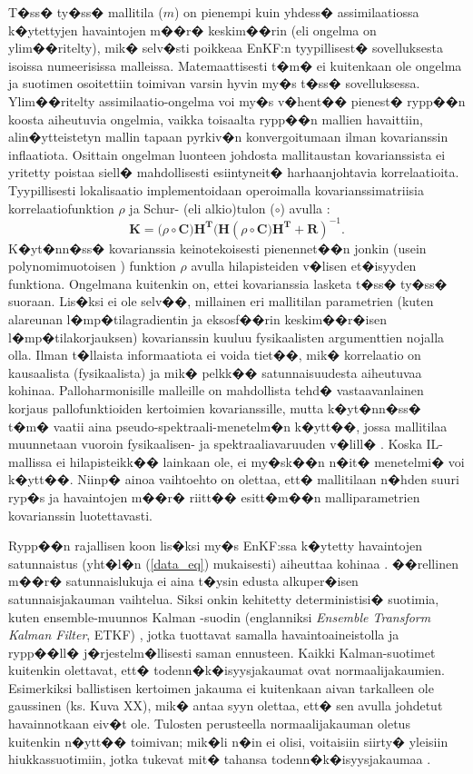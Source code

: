 \documentclass[12pt,a4paper,finnish,margin=2in]{article}
\begin{document}
T�ss� ty�ss� mallitila ($m$) on pienempi kuin yhdess� assimilaatiossa k�ytettyjen havaintojen m��r� keskim��rin (eli ongelma on ylim��ritelty), mik� selv�sti poikkeaa EnKF:n tyypillisest� sovelluksesta isoissa numeerisissa malleissa. Matemaattisesti t�m� ei kuitenkaan ole ongelma ja suotimen osoitettiin toimivan varsin hyvin my�s t�ss� sovelluksessa. Ylim��ritelty assimilaatio-ongelma voi my�s v�hent�� pienest� rypp��n koosta aiheutuvia ongelmia, vaikka toisaalta rypp��n mallien havaittiin, alin�ytteistetyn mallin tapaan pyrkiv�n konvergoitumaan ilman kovarianssin inflaatiota. Osittain ongelman luonteen johdosta mallitaustan kovarianssista ei yritetty poistaa siell� mahdollisesti esiintyneit� harhaanjohtavia korrelaatioita. Tyypillisesti lokalisaatio implementoidaan operoimalla kovarianssimatriisia korrelaatiofunktion $\rho$ ja Schur- (eli alkio)tulon ($\circ$) avulla \citep{houtekamer_2001}:
\begin{equation} \label{lm_eq}
\mathbf{K} = (\rho \circ \mathbf{C)H^T}(\mathbf{H}(\rho \circ \mathbf{C)H^T + R})^{-1}.
\end{equation}
K�yt�nn�ss� kovarianssia keinotekoisesti pienennet��n jonkin (usein polynomimuotoisen \citep{gaspari_1999}) funktion $\rho$ avulla hilapisteiden v�lisen et�isyyden funktiona. Ongelmana kuitenkin on, ettei kovarianssia lasketa t�ss� ty�ss� suoraan. Lis�ksi ei ole selv��, millainen eri mallitilan parametrien (kuten alareunan l�mp�tilagradientin ja eksosf��rin keskim��r�isen l�mp�tilakorjauksen) kovarianssin kuuluu fysikaalisten argumenttien nojalla olla. Ilman t�llaista informaatiota ei voida tiet��, mik� korrelaatio on kausaalista (fysikaalista) ja mik� pelkk�� satunnaisuudesta aiheutuvaa kohinaa. Palloharmonisille malleille on mahdollista tehd� vastaavanlainen korjaus pallofunktioiden kertoimien kovarianssille, mutta k�yt�nn�ss� t�m� vaatii aina pseudo-spektraali-menetelm�n k�ytt��, jossa mallitilaa muunnetaan vuoroin fysikaalisen- ja spektraaliavaruuden v�lill� \citep{buehner_2012}. Koska IL-mallissa ei hilapisteikk�� lainkaan ole, ei my�sk��n n�it� menetelmi� voi k�ytt��. Niinp� ainoa vaihtoehto on olettaa, ett� mallitilaan n�hden suuri ryp�s ja havaintojen m��r� riitt�� esitt�m��n malliparametrien kovarianssin luotettavasti. 

Rypp��n rajallisen koon lis�ksi my�s EnKF:ssa k�ytetty havaintojen satunnaistus (yht�l�n (\ref{data_eq}) mukaisesti) aiheuttaa kohinaa \citep{whitaker_2002}. ��rellinen m��r� satunnaislukuja ei aina t�ysin edusta alkuper�isen satunnaisjakauman vaihtelua. Siksi onkin kehitetty deterministisi� suotimia, kuten ensemble-muunnos Kalman -suodin (englanniksi \textit{Ensemble Transform Kalman Filter}, ETKF) \citep{bishop_2001}, jotka tuottavat samalla havaintoaineistolla ja rypp��ll� j�rjestelm�llisesti saman ennusteen. Kaikki Kalman-suotimet kuitenkin olettavat, ett� todenn�k�isyysjakaumat ovat normaalijakaumien. Esimerkiksi ballistisen kertoimen jakauma ei kuitenkaan aivan tarkalleen ole gaussinen (ks. Kuva XX), mik� antaa syyn olettaa, ett� sen avulla johdetut havainnotkaan eiv�t ole. Tulosten perusteella normaalijakauman oletus kuitenkin n�ytt�� toimivan; mik�li n�in ei olisi, voitaisiin siirty� yleisiin hiukkassuotimiin, jotka tukevat mit� tahansa todenn�k�isyysjakaumaa \citep{moradkhani_2005}.
\end{document}
